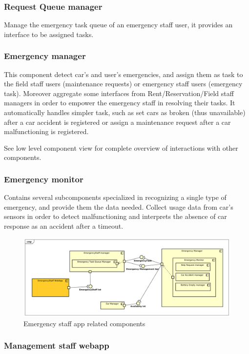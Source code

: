 \documentclass[english]{article}
\begin{document}
		\subsubsection{Request Queue manager}
		Manage the emergency task queue of an emergency staff user, it provides an interface to be assigned tasks.
	\subsubsection{Emergency manager}
	This component detect car's and user's emergencies, and assign them as task to the field staff users (maintenance requests) or  emergency staff users (emergency task). Moreover aggregate some interfaces from Rent/Reservation/Field staff managers in order to empower the emergency staff in resolving their tasks. It automatically handles simpler task, such as set cars as broken (thus unavailable) after a car accident is registered or assign a maintenance request after a car malfunctioning is registered. \par See low level component view for complete overview of interactions with other components.
		\subsubsection{Emergency monitor}
		Contains several subcomponents specialized in recognizing a single type of emergency, and provide them the data needed. Collect usage data from car's sensors in order to detect malfunctioning and interprets the absence of car response as an accident after a timeout.  
	\begin{figure}[H]
		\centering
		\includegraphics[scale=0.35]{./ComponentDiagrams/EmergencyStaff.pdf}%
		\caption{Emergency staff app related components}
	\end{figure}
	
	
\subsubsection*{Management staff webapp}
\end{document}

